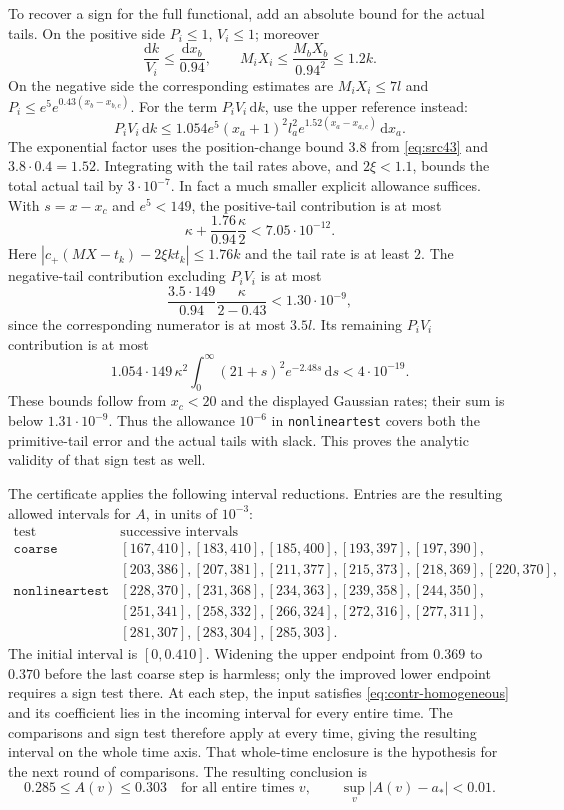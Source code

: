 \documentclass[11pt,a4paper]{article}
\numberwithin{equation}{section}
\theoremstyle{definition}
\theoremstyle{remark}
\newcommand{\dd}{\mathrm d}
\begin{document}
To recover a sign for the full functional, add an absolute bound for
the actual tails.  On the positive side $P_i\le1$, $V_i\le1$;
moreover
\[
 \frac{\dd k}{V_i}\le\frac{\dd x_b}{0.94},\qquad
 M_iX_i\le\frac{M_bX_b}{0.94^2}\le1.2k.
\]
On the negative side the corresponding estimates are
$M_iX_i\le7l$ and
$P_i\le e^5e^{0.43(x_b-x_{b,c})}$.
For the term $P_iV_i\,\dd k$, use the upper reference instead:
\[
 P_iV_i\,\dd k
 \le1.054e^5(x_a+1)^2l_a^2
          e^{1.52(x_a-x_{a,c})}\,\dd x_a.
\]
The exponential factor uses the position-change bound $3.8$ from
\eqref{eq:src43} and $3.8\cdot0.4=1.52$.
Integrating with the tail rates above, and $2\xi<1.1$, bounds the
total actual tail by $3\cdot10^{-7}$.  In fact a much smaller
explicit allowance suffices.  With $s=x-x_c$ and $e^5<149$, the
positive-tail contribution is at most
\[
 \kappa+\frac{1.76}{0.94}\frac\kappa2<7.05\cdot10^{-12}.
\]
Here $|c_+(MX-t_k)-2\xi kt_k|\le1.76k$ and the tail rate is
at least $2$.  The negative-tail contribution excluding $P_iV_i$
is at most
\[
 \frac{3.5\cdot149}{0.94}\frac\kappa{2-0.43}<1.30\cdot10^{-9},
\]
since the corresponding numerator is at most $3.5l$.
Its remaining $P_iV_i$ contribution is at most
\[
 1.054\cdot149\,\kappa^2
 \int_0^\infty(21+s)^2e^{-2.48s}\,\dd s<4\cdot10^{-19}.
\]
These bounds follow from $x_c<20$ and the displayed Gaussian rates;
their sum is below $1.31\cdot10^{-9}$.
Thus the allowance $10^{-6}$
in \texttt{nonlineartest} covers both the primitive-tail error and
the actual tails with slack.  This proves the analytic validity of
that sign test as well.

The certificate applies the following interval reductions.  Entries
are the resulting allowed intervals for $A$, in units of $10^{-3}$:
\[
\begin{array}{c|l}
 \text{test}&\text{successive intervals}\\ \hline
 \texttt{coarse}&
 [167,410], [183,410], [185,400], [193,397], [197,390],\\
 & [203,386], [207,381], [211,377], [215,373], [218,369], [220,370],\\[2pt]
 \texttt{nonlineartest}&
 [228,370], [231,368], [234,363], [239,358], [244,350],\\
 & [251,341], [258,332], [266,324], [272,316], [277,311],\\
 & [281,307], [283,304], [285,303].
\end{array}
\]
The initial interval is $[0,0.410]$.  Widening the upper endpoint
from $0.369$ to $0.370$ before the last coarse step is harmless;
only the improved lower endpoint requires a sign test there.
At each step, the input satisfies \eqref{eq:contr-homogeneous} and
its coefficient lies in the incoming interval for every entire time.
The comparisons and sign test therefore apply at every time, giving
the resulting interval on the whole time axis.  That whole-time
enclosure is the hypothesis for the next round of comparisons.
The resulting conclusion is
\[
 0.285\le A(v)\le0.303\quad\text{for all entire times }v,\qquad
 \sup_v|A(v)-a_*|<0.01.
\]
\end{document}
